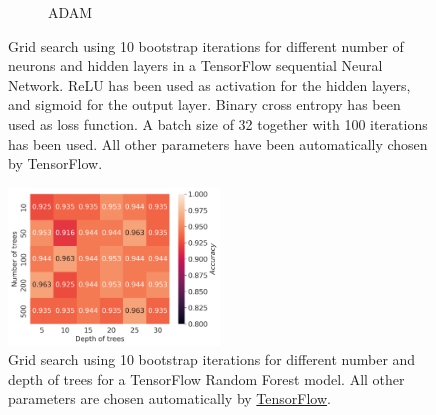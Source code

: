\documentclass[11pt]{article}
\begin{document}
\begin{figure}[H]
\begin{subfigure}{.5\textwidth}
        \caption{ADAM}
        \label{fig:}
    \end{subfigure}
    \caption{Grid search using 10 bootstrap iterations for different number of neurons and hidden layers in a TensorFlow sequential Neural Network. ReLU has been used as activation for the hidden layers, and sigmoid for the output layer. Binary cross entropy has been used as loss function. A batch size of 32 together with 100 iterations has been used. All other parameters have been automatically chosen by TensorFlow.}
    \label{fig:cobar_grid}
\end{figure}
\begin{figure}[H]
    \centering
    \includegraphics[width=0.5\textwidth]{../figures/RF_grid_bootstrap_cobar.png}
    \caption{Grid search using 10 bootstrap iterations for different number and depth of trees for a TensorFlow Random Forest model. All other parameters are chosen automatically by \href{https://www.tensorflow.org/decision_forests/api_docs/python/tfdf/keras/RandomForestModel}{TensorFlow}.}
    \label{fig:cobar_grid_rf}
\end{figure}
\end{document}
